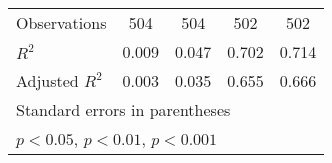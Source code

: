 {\begin{tabular}{l*{4}{c}}
\hline
Observations        &         504         &         504         &         502         &         502         \\
\(R^{2}\)           &       0.009         &       0.047         &       0.702         &       0.714         \\
Adjusted \(R^{2}\)  &       0.003         &       0.035         &       0.655         &       0.666         \\
\hline\hline
\multicolumn{5}{l}{\footnotesize Standard errors in parentheses}\\
\multicolumn{5}{l}{\footnotesize \sym{*} \(p<0.05\), \sym{**} \(p<0.01\), \sym{***} \(p<0.001\)}\\
\end{tabular}
}
